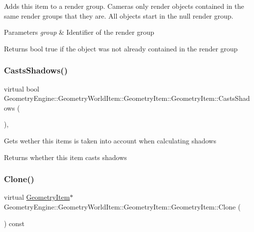 Adds this item to a render group. Cameras only render objects contained in the same render groups that they are. All objects start in the null render group. 
\begin{DoxyParams}{Parameters}
{\em group} & Identifier of the render group \\
\hline
\end{DoxyParams}
\begin{DoxyReturn}{Returns}
bool true if the object was not already contained in the render group 
\end{DoxyReturn}
\mbox{\label{class_geometry_engine_1_1_geometry_world_item_1_1_geometry_item_1_1_geometry_item_a4b9c066cbd4ab85ffae11bb4dcd9fc64}} 
\subsubsection{\texorpdfstring{CastsShadows()}{CastsShadows()}}
{\footnotesize\ttfamily virtual bool Geometry\+Engine\+::\+Geometry\+World\+Item\+::\+Geometry\+Item\+::\+Geometry\+Item\+::\+Casts\+Shadows (\begin{DoxyParamCaption}{ }\end{DoxyParamCaption})\hspace{0.3cm}{\ttfamily [inline]}, {\ttfamily [virtual]}}

Gets wether this items is taken into account when calculating shadows \begin{DoxyReturn}{Returns}
whether this item casts shadows 
\end{DoxyReturn}
\mbox{\label{class_geometry_engine_1_1_geometry_world_item_1_1_geometry_item_1_1_geometry_item_a1db8f97339ba49f746b3e0b4c4b02748}} 
\subsubsection{\texorpdfstring{Clone()}{Clone()}}
{\footnotesize\ttfamily virtual \mbox{\hyperlink{class_geometry_engine_1_1_geometry_world_item_1_1_geometry_item_1_1_geometry_item}{Geometry\+Item}}$\ast$ Geometry\+Engine\+::\+Geometry\+World\+Item\+::\+Geometry\+Item\+::\+Geometry\+Item\+::\+Clone (\begin{DoxyParamCaption}{ }\end{DoxyParamCaption}) const\hspace{0.3cm}{\ttfamily [pure virtual]}}


